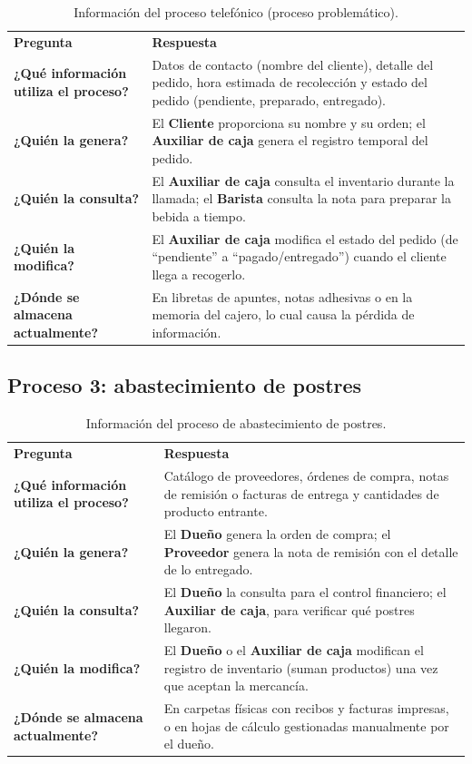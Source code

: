 \documentclass[12pt,letterpaper]{article}
\newcommand{\thd}[1]{\sffamily\bfseries #1}
\newcommand{\cab}{\rowcolor{black!18}}
\begin{document}
\begin{table}[H]
\centering
\small
\begin{tabularx}{\textwidth}{>{\bfseries}p{4.2cm}Y}
\cab \thd{Pregunta} & \thd{Respuesta}\\
¿Qué información utiliza el proceso? & Datos de contacto (nombre del cliente), detalle del pedido, hora estimada de recolección y estado del pedido (pendiente, preparado, entregado).\\
¿Quién la genera? & El \textbf{Cliente} proporciona su nombre y su orden; el \textbf{Auxiliar de caja} genera el registro temporal del pedido.\\
¿Quién la consulta? & El \textbf{Auxiliar de caja} consulta el inventario durante la llamada; el \textbf{Barista} consulta la nota para preparar la bebida a tiempo.\\
¿Quién la modifica? & El \textbf{Auxiliar de caja} modifica el estado del pedido (de ``pendiente'' a ``pagado/entregado'') cuando el cliente llega a recogerlo.\\
¿Dónde se almacena actualmente? & En libretas de apuntes, notas adhesivas o en la memoria del cajero, lo cual causa la pérdida de información.\\
\end{tabularx}
\caption{Información del proceso telefónico (proceso problemático).}
\end{table}

\subsection{Proceso 3: abastecimiento de postres}

\begin{table}[H]
\centering
\small
\begin{tabularx}{\textwidth}{>{\bfseries}p{4.2cm}Y}
\cab \thd{Pregunta} & \thd{Respuesta}\\
¿Qué información utiliza el proceso? & Catálogo de proveedores, órdenes de compra, notas de remisión o facturas de entrega y cantidades de producto entrante.\\
¿Quién la genera? & El \textbf{Dueño} genera la orden de compra; el \textbf{Proveedor} genera la nota de remisión con el detalle de lo entregado.\\
¿Quién la consulta? & El \textbf{Dueño} la consulta para el control financiero; el \textbf{Auxiliar de caja}, para verificar qué postres llegaron.\\
¿Quién la modifica? & El \textbf{Dueño} o el \textbf{Auxiliar de caja} modifican el registro de inventario (suman productos) una vez que aceptan la mercancía.\\
¿Dónde se almacena actualmente? & En carpetas físicas con recibos y facturas impresas, o en hojas de cálculo gestionadas manualmente por el dueño.\\
\end{tabularx}
\caption{Información del proceso de abastecimiento de postres.}
\end{table}
\end{document}
